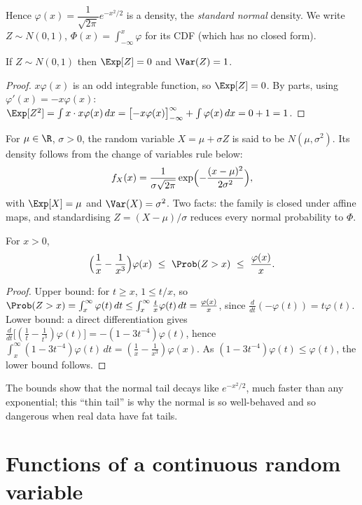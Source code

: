 Hence $\varphi(x)=\dfrac1{\sqrt{2\pi}}e^{-x^2/2}$ is a density, the \emph{standard
normal} density. We write $Z\sim N(0,1)$, $\Phi(x)=\int_{-\infty}^x\varphi$ for its
CDF (which has no closed form).

\begin{proposition}\label{prop:normalmoments}
If $Z\sim N(0,1)$ then $\Exp[Z]=0$ and $\Var(Z)=1$.
\end{proposition}
\begin{proof}
$x\varphi(x)$ is an odd integrable function, so $\Exp[Z]=0$. By parts, using
$\varphi'(x)=-x\varphi(x)$:
$\Exp[Z^2]=\int x\cdot x\varphi(x)\,dx=\bigl[-x\varphi(x)\bigr]_{-\infty}^\infty
+\int\varphi(x)\,dx=0+1=1$.
\end{proof}

For $\mu\in\R$, $\sigma>0$, the random variable $X=\mu+\sigma Z$ is said to be
$N(\mu,\sigma^2)$. Its density follows from the change of variables rule below:
\[
f_X(x)=\frac1{\sigma\sqrt{2\pi}}\exp\Bigl(-\frac{(x-\mu)^2}{2\sigma^2}\Bigr),
\]
with $\Exp[X]=\mu$ and $\Var(X)=\sigma^2$. Two facts: the family is closed under
affine maps, and standardising $Z=(X-\mu)/\sigma$ reduces every normal
probability to $\Phi$.

\begin{theorem}\label{thm:mills}
For $x>0$,
\[
\Bigl(\frac1x-\frac1{x^3}\Bigr)\varphi(x)\ \le\ \Prob(Z>x)\ \le\ \frac{\varphi(x)}x.
\]
\end{theorem}
\begin{proof}
Upper bound: for $t\ge x$, $1\le t/x$, so
$\Prob(Z>x)=\int_x^\infty\varphi(t)\,dt\le\int_x^\infty\frac tx\varphi(t)\,dt
=\frac{\varphi(x)}x$, since $\frac d{dt}(-\varphi(t))=t\varphi(t)$.
Lower bound: a direct differentiation gives
$\frac d{dt}\bigl[(\tfrac1t-\tfrac1{t^3})\varphi(t)\bigr]=-(1-3t^{-4})\varphi(t)$, hence
$\int_x^\infty(1-3t^{-4})\varphi(t)\,dt=(\tfrac1x-\tfrac1{x^3})\varphi(x)$. As
$(1-3t^{-4})\varphi(t)\le\varphi(t)$, the lower bound follows.
\end{proof}

The bounds show that the normal tail decays like $e^{-x^2/2}$, much faster than
any exponential; this ``thin tail'' is why the normal is so well-behaved and so
dangerous when real data have fat tails.

\section{Functions of a continuous random variable}

